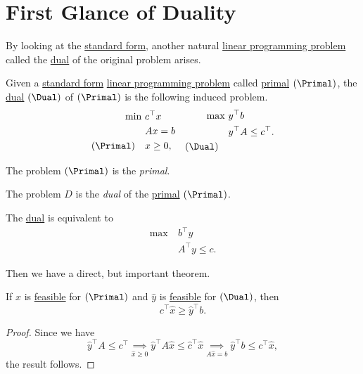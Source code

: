 \section{First Glance of Duality}
By looking at the \hyperref[def:standard-form]{standard form}, another natural \hyperref[def:general-linear-programming-problem]{linear programming problem} called the \hyperref[def:dual]{dual} of the original problem arises.
\begin{definition}
	Given a \hyperref[def:standard-form]{standard form} \hyperref[def:general-linear-programming-problem]{linear programming problem} called \hyperref[def:primal]{primal} \((\Primal)\), the \hyperref[def:dual]{dual} \((\Dual)\) of \((\Primal)\) is the following induced problem.
	\[
		\begin{aligned}
			\min~          & c^{\top}x \\
			               & Ax = b    \\
			(\Primal)\quad & x\geq  0,
		\end{aligned}\quad \begin{aligned}
			\max ~       & y^{\top}b               \\
			             & y^{\top}A\leq c^{\top}. \\
			(\Dual)\quad &
		\end{aligned}
	\]
	\begin{definition}[Primal]\label{def:primal}
		The problem \((\Primal)\) is the \emph{primal}.
	\end{definition}

	\begin{definition}[Dual]\label{def:dual}
		The problem \(D\) is the \emph{dual} of the \hyperref[def:primal]{primal} \((\Primal)\).
	\end{definition}
\end{definition}

\begin{note}
	The \hyperref[def:dual]{dual} is equivalent to
	\[
		\begin{aligned}
			\max~ & b^{\top}y         \\
			      & A^{\top}y \leq c.
		\end{aligned}
	\]
\end{note}

Then we have a direct, but important theorem.
\begin{theorem}\label{thm:weak-duality}
	If \(\hat{x}\) is \hyperref[def:feasible-solution]{feasible} for \((\Primal)\) and \(\hat{y}\) is \hyperref[def:feasible-solution]{feasible} for \((\Dual)\), then
	\[
		c^{\top}\hat{x} \geq  \hat{y}^{\top} b.
	\]
\end{theorem}
\begin{proof}
	Since we have
	\[
		\hat{y}^{\top}A\leq c^{\top} \underset{\hat{x}\geq 0}{\implies} \hat{y}^{\top}A \hat{x} \leq \hat{c}^{\top} \hat{x} \underset{A \hat{x} = b}{\implies} \hat{y}^{\top}b \leq c^{\top} \hat{x},
	\]
	the result follows.
\end{proof}

